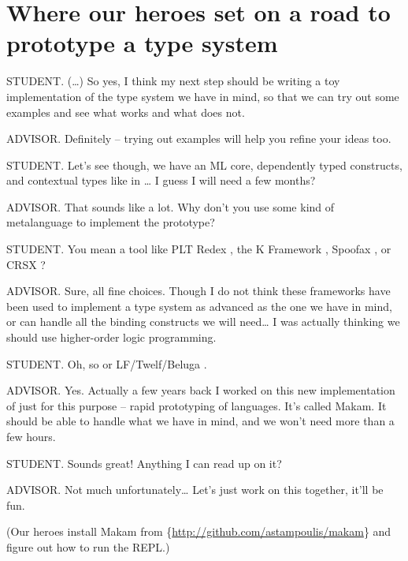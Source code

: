 \section{Where our heroes set on a road to prototype a type
system}\label{where-our-heroes-set-on-a-road-to-prototype-a-type-system}

STUDENT. (\ldots{}) So yes, I think my next step should be writing a toy
implementation of the type system we have in mind, so that we can try
out some examples and see what works and what does not.

ADVISOR. Definitely -- trying out examples will help you refine your
ideas too.

STUDENT. Let's see though, we have an ML core, dependently typed
constructs, and contextual types like in
\citet{nanevski2008contextual}\ldots{} I guess I will need a few months?

ADVISOR. That sounds like a lot. Why don't you use some kind of
metalanguage to implement the prototype?

STUDENT. You mean a tool like PLT Redex \citep{felleisen2009semantics},
the K Framework \citep{rosu2010overview,ellison2009rewriting}, Spoofax
\citep{kats2010spoofax}, or CRSX \citep{rose2011crsx}?

ADVISOR. Sure, all fine choices. Though I do not think these frameworks
have been used to implement a type system as advanced as the one we have
in mind, or can handle all the binding constructs we will need\ldots{} I
was actually thinking we should use higher-order logic programming.

STUDENT. Oh, so \lamprolog \citep{miller1988overview} or LF/Twelf/Beluga
\citep{pfenning1999system,pientka2010beluga}.

ADVISOR. Yes. Actually a few years back I worked on this new
implementation of \lamprolog
just for this purpose -- rapid prototyping of languages. It's called
Makam. It should be able to handle what we have in mind, and we won't
need more than a few hours.

STUDENT. Sounds great! Anything I can read up on it?

ADVISOR. Not much unfortunately\ldots{} Let's just work on this
together, it'll be fun.

(Our heroes install Makam from
\if@ACM@anonymous\{\url{http://github.com/astampoulis/makam}\}\fi\xspace
and figure out how to run the REPL.)
